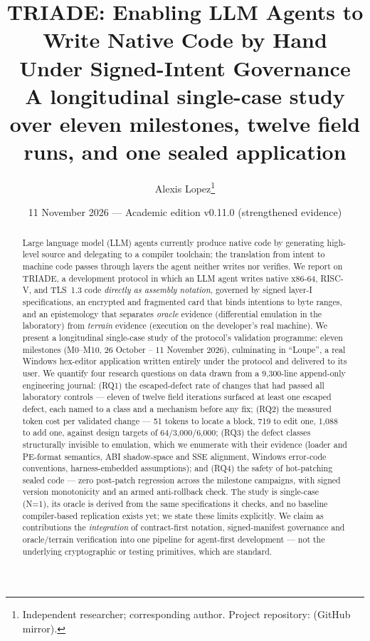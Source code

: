 \documentclass[11pt,a4paper]{article}
\title{\textbf{TRIADE: Enabling LLM Agents to Write Native Code by Hand\\
Under Signed-Intent Governance\\
\large A longitudinal single-case study over eleven milestones, twelve field
runs, and one sealed application}}
\author{Alexis Lopez\thanks{Independent researcher; corresponding author.
Project repository: \code{alexisfrlopez-debug/triade} (GitHub mirror).}}
\date{11 November 2026 — Academic edition v0.11.0 (strengthened evidence)}
\begin{document}
\maketitle
\thispagestyle{fancy}

\begin{abstract}
\noindent Large language model (LLM) agents currently produce native code by
generating high-level source and delegating to a compiler toolchain; the
translation from intent to machine code passes through layers the agent
neither writes nor verifies. We report on TRIADE, a development protocol in
which an LLM agent writes native x86-64, RISC-V, and TLS~1.3 code
\emph{directly as assembly notation}, governed by signed layer-I
specifications, an encrypted and fragmented card that binds intentions to
byte ranges, and an epistemology that separates \emph{oracle} evidence
(differential emulation in the laboratory) from \emph{terrain} evidence
(execution on the developer's real machine). We present a longitudinal
single-case study of the protocol's validation programme: eleven milestones
(M0--M10, 26 October -- 11 November 2026), culminating in ``Loupe'', a real
Windows hex-editor application written entirely under the protocol and
delivered to its user. We quantify four research questions on data drawn
from a 9{,}300-line append-only engineering journal: (RQ1) the
escaped-defect rate of changes that had passed all laboratory controls ---
eleven of twelve field iterations surfaced at least one escaped defect,
each named to a class and a mechanism before any fix; (RQ2) the measured
token cost per validated change --- 51 tokens to locate a block, 719 to
edit one, 1{,}088 to add one, against design targets of 64/3{,}000/6{,}000;
(RQ3) the defect classes structurally invisible to emulation, which we
enumerate with their evidence (loader and PE-format semantics, ABI
shadow-space and SSE alignment, Windows error-code conventions,
harness-embedded assumptions); and (RQ4) the safety of hot-patching sealed
code --- zero post-patch regression across the milestone campaigns, with
signed version monotonicity and an armed anti-rollback check. The study is
single-case (N=1), its oracle is derived from the same specifications it
checks, and no baseline compiler-based replication exists yet; we state
these limits explicitly. We claim as contributions the \emph{integration}
of contract-first notation, signed-manifest governance and oracle/terrain
verification into one pipeline for agent-first development --- not the
underlying cryptographic or testing primitives, which are standard.
\end{abstract}
\end{document}
